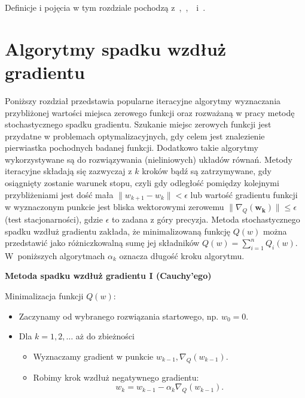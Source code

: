 Definicje i pojęcia w tym rozdziale pochodzą z~\cite{bott1},~\cite{bott2},~\cite{kotlowski}~i~\cite{fortuna}.

\newpage
\section{Algorytmy spadku wzdłuż gradientu}\label{R-N}

Poniższy rozdział przedstawia popularne iteracyjne algorytmy wyznaczania przybliżonej wartości miejsca zerowego funkcji oraz rozważaną w pracy metodę stochastycznego spadku gradientu. Szukanie miejsc zerowych funkcji jest przydatne w problemach optymalizacyjnych, gdy celem jest znalezienie pierwiastka pochodnych badanej funkcji. Dodatkowo takie algorytmy wykorzystywane są do rozwiązywania (nieliniowych) układów równań. Metody iteracyjne składają się zazwyczaj z $k$ kroków bądź są zatrzymywane, gdy osiągnięty zostanie warunek stopu, czyli gdy odległość pomiędzy kolejnymi przybliżeniami jest dość mała $\parallel w_{k+1}-w_k\parallel < \epsilon$ lub wartość gradientu funkcji w wyznaczonym punkcie jest bliska wektorowymi zerowemu $\parallel \nabla_Q(\mathbf{w_k}) \parallel \leqslant \epsilon$ (test stacjonarności), gdzie $\epsilon$ to zadana z góry precyzja.
Metoda stochastycznego spadku wzdłuż gradientu zakłada, że minimalizowaną funkcję $Q(w)$ można przedstawić jako różniczkowalną sumę jej składników $Q(w) = \sum_{i=1}^{n}Q_i(w)$. W~poniższych algorytmach $\alpha_k$ oznacza długość kroku algorytmu.
\begin{center}
\textbf{Metoda spadku wzdłuż gradientu I (Cauchy’ego)}
\end{center}
Minimalizacja funkcji $Q(w)$:
\begin{itemize}
\item Zaczynamy od wybranego rozwiązania startowego, np. $w_{0} = 0$.
\item Dla $k = 1, 2, \dots$ aż do zbieżności
	\begin{itemize}
	\item Wyznaczamy gradient w punkcie $w_{k-1}, \nabla_{Q}(w_{k-1})$.
	\item Robimy krok wzdłuż negatywnego gradientu: $$w_{k} = w_{k-1} - \alpha_{k}\nabla_{Q}(w_{k-1}). $$
	\end{itemize}
\end{itemize}

